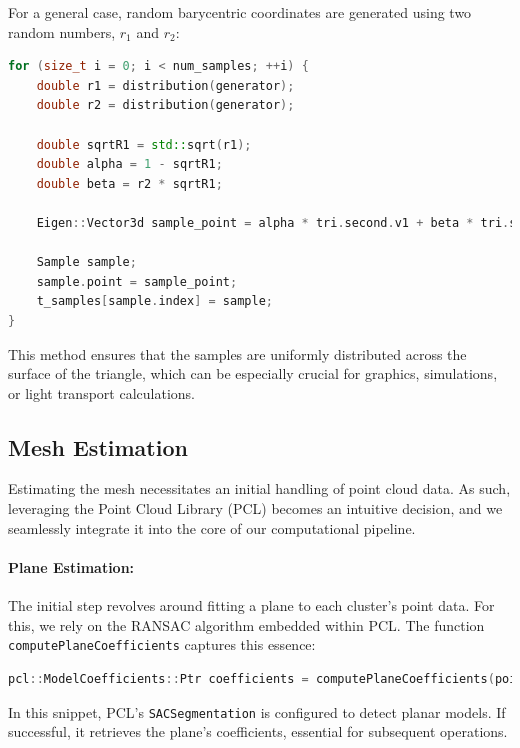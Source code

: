 \documentclass[11pt, a4paper,oneside,chapterprefix=false]{scrbook}
\begin{document}
For a general case, random barycentric coordinates are generated using two random numbers, \( r_1 \) and \( r_2 \):

\begin{lstlisting}[language=C++, caption=Barycentric Coordinate Sampling]
for (size_t i = 0; i < num_samples; ++i) {
	double r1 = distribution(generator);
	double r2 = distribution(generator);

	double sqrtR1 = std::sqrt(r1);
	double alpha = 1 - sqrtR1;
	double beta = r2 * sqrtR1;

	Eigen::Vector3d sample_point = alpha * tri.second.v1 + beta * tri.second.v2 + (1 - alpha - beta) * tri.second.v3;

	Sample sample;
	sample.point = sample_point;
	t_samples[sample.index] = sample;
}
\end{lstlisting}

This method ensures that the samples are uniformly distributed across the surface of the triangle, which can be especially crucial for graphics, simulations, or light transport calculations.


\subsection{Mesh Estimation}\label{sec:mesh estimation}

Estimating the mesh necessitates an initial handling of point cloud data. As such, leveraging the Point Cloud Library (PCL) becomes an intuitive decision, and we seamlessly integrate it into the core of our computational pipeline.


\paragraph{Plane Estimation:} The initial step revolves around fitting a plane to each cluster's point data. For this, we rely on the RANSAC algorithm embedded within PCL. The function \texttt{computePlaneCoefficients} captures this essence:

\begin{lstlisting}[language=C++, caption=Estimating Plane Coefficients]
pcl::ModelCoefficients::Ptr coefficients = computePlaneCoefficients(points);
\end{lstlisting}

In this snippet, PCL's \texttt{SACSegmentation} is configured to detect planar models. If successful, it retrieves the plane's coefficients, essential for subsequent operations.
\end{document}

